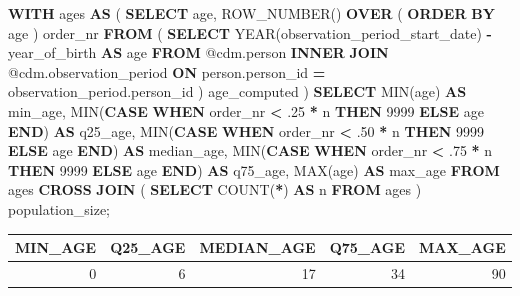 \documentclass[11pt]{book}
\newenvironment{Shaded}{\begin{snugshade}}{\end{snugshade}}
\newcommand{\ControlFlowTok}[1]{\textcolor[rgb]{0.13,0.29,0.53}{\textbf{#1}}}
\newcommand{\DataTypeTok}[1]{\textcolor[rgb]{0.13,0.29,0.53}{#1}}
\newcommand{\DecValTok}[1]{\textcolor[rgb]{0.00,0.00,0.81}{#1}}
\newcommand{\FloatTok}[1]{\textcolor[rgb]{0.00,0.00,0.81}{#1}}
\newcommand{\FunctionTok}[1]{\textcolor[rgb]{0.00,0.00,0.00}{#1}}
\newcommand{\KeywordTok}[1]{\textcolor[rgb]{0.13,0.29,0.53}{\textbf{#1}}}
\newcommand{\NormalTok}[1]{#1}
\newcommand{\OperatorTok}[1]{\textcolor[rgb]{0.81,0.36,0.00}{\textbf{#1}}}
\theoremstyle{definition}
\theoremstyle{definition}
\theoremstyle{definition}
\theoremstyle{remark}
\begin{document}
\begin{Shaded}
\begin{Highlighting}[]
\KeywordTok{WITH}\NormalTok{ ages}
\KeywordTok{AS}\NormalTok{ (}
    \KeywordTok{SELECT}\NormalTok{ age,}
        \FunctionTok{ROW_NUMBER}\NormalTok{() }\KeywordTok{OVER}\NormalTok{ (}
            \KeywordTok{ORDER} \KeywordTok{BY}\NormalTok{ age}
\NormalTok{            ) order_nr}
    \KeywordTok{FROM}\NormalTok{ (}
        \KeywordTok{SELECT} \DataTypeTok{YEAR}\NormalTok{(observation_period_start_date) }\OperatorTok{-}\NormalTok{ year_of_birth }\KeywordTok{AS}\NormalTok{ age}
        \KeywordTok{FROM}\NormalTok{ @cdm.person}
        \KeywordTok{INNER} \KeywordTok{JOIN}\NormalTok{ @cdm.observation_period}
            \KeywordTok{ON}\NormalTok{ person.person_id }\OperatorTok{=}\NormalTok{ observation_period.person_id}
\NormalTok{        ) age_computed}
\NormalTok{    )}
\KeywordTok{SELECT} \FunctionTok{MIN}\NormalTok{(age) }\KeywordTok{AS}\NormalTok{ min_age,}
    \FunctionTok{MIN}\NormalTok{(}\ControlFlowTok{CASE} 
            \ControlFlowTok{WHEN}\NormalTok{ order_nr }\OperatorTok{<} \FloatTok{.25} \OperatorTok{*}\NormalTok{ n}
                \ControlFlowTok{THEN} \DecValTok{9999}
            \ControlFlowTok{ELSE}\NormalTok{ age}
            \ControlFlowTok{END}\NormalTok{) }\KeywordTok{AS}\NormalTok{ q25_age,}
    \FunctionTok{MIN}\NormalTok{(}\ControlFlowTok{CASE} 
            \ControlFlowTok{WHEN}\NormalTok{ order_nr }\OperatorTok{<} \FloatTok{.50} \OperatorTok{*}\NormalTok{ n}
                \ControlFlowTok{THEN} \DecValTok{9999}
            \ControlFlowTok{ELSE}\NormalTok{ age}
            \ControlFlowTok{END}\NormalTok{) }\KeywordTok{AS}\NormalTok{ median_age,}
    \FunctionTok{MIN}\NormalTok{(}\ControlFlowTok{CASE} 
            \ControlFlowTok{WHEN}\NormalTok{ order_nr }\OperatorTok{<} \FloatTok{.75} \OperatorTok{*}\NormalTok{ n}
                \ControlFlowTok{THEN} \DecValTok{9999}
            \ControlFlowTok{ELSE}\NormalTok{ age}
            \ControlFlowTok{END}\NormalTok{) }\KeywordTok{AS}\NormalTok{ q75_age,}
    \FunctionTok{MAX}\NormalTok{(age) }\KeywordTok{AS}\NormalTok{ max_age}
\KeywordTok{FROM}\NormalTok{ ages}
\KeywordTok{CROSS} \KeywordTok{JOIN}\NormalTok{ (}
    \KeywordTok{SELECT} \FunctionTok{COUNT}\NormalTok{(}\OperatorTok{*}\NormalTok{) }\KeywordTok{AS}\NormalTok{ n}
    \KeywordTok{FROM}\NormalTok{ ages}
\NormalTok{    ) population_size;}
\end{Highlighting}
\end{Shaded}

\begin{longtable}[]{@{}rrrrr@{}}
\toprule
MIN\_AGE & Q25\_AGE & MEDIAN\_AGE & Q75\_AGE & MAX\_AGE\tabularnewline
\midrule
\endhead
0 & 6 & 17 & 34 & 90\tabularnewline
\bottomrule
\end{longtable}
\end{document}

